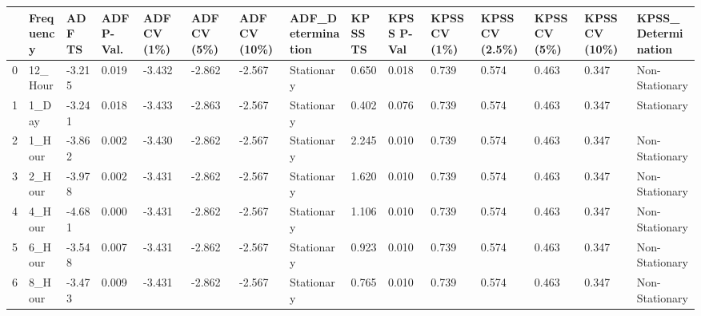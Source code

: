 \begin{tabular}{lllllllllllllll}
\toprule
 & Frequency & ADF TS & ADF P-Val. & ADF CV (1\%) & ADF CV (5\%) & ADF CV (10\%) & ADF_Determination & KPSS TS & KPSS P-Val & KPSS CV (1\%) & KPSS CV (2.5\%) & KPSS CV (5\%) & KPSS CV (10\%) & KPSS_Determination \\
\midrule
0 & 12_Hour & -3.215 & 0.019 & -3.432 & -2.862 & -2.567 & Stationary & 0.650 & 0.018 & 0.739 & 0.574 & 0.463 & 0.347 & Non-Stationary \\
1 & 1_Day & -3.241 & 0.018 & -3.433 & -2.863 & -2.567 & Stationary & 0.402 & 0.076 & 0.739 & 0.574 & 0.463 & 0.347 & Stationary \\
2 & 1_Hour & -3.862 & 0.002 & -3.430 & -2.862 & -2.567 & Stationary & 2.245 & 0.010 & 0.739 & 0.574 & 0.463 & 0.347 & Non-Stationary \\
3 & 2_Hour & -3.978 & 0.002 & -3.431 & -2.862 & -2.567 & Stationary & 1.620 & 0.010 & 0.739 & 0.574 & 0.463 & 0.347 & Non-Stationary \\
4 & 4_Hour & -4.681 & 0.000 & -3.431 & -2.862 & -2.567 & Stationary & 1.106 & 0.010 & 0.739 & 0.574 & 0.463 & 0.347 & Non-Stationary \\
5 & 6_Hour & -3.548 & 0.007 & -3.431 & -2.862 & -2.567 & Stationary & 0.923 & 0.010 & 0.739 & 0.574 & 0.463 & 0.347 & Non-Stationary \\
6 & 8_Hour & -3.473 & 0.009 & -3.431 & -2.862 & -2.567 & Stationary & 0.765 & 0.010 & 0.739 & 0.574 & 0.463 & 0.347 & Non-Stationary \\
\bottomrule
\end{tabular}
